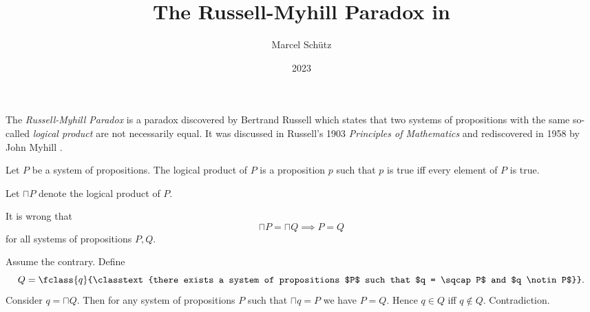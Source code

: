 \documentclass{stex}
\title{The Russell-Myhill Paradox in \Naproche}
\author{Marcel Schütz}
\date{2023}
\begin{document}
\maketitle


\noindent The \emph{Russell-Myhill Paradox} is a paradox discovered by Bertrand Russell which states that two systems of propositions with the same so-called \emph{logical product} are not necessarily equal.
It was discussed in Russell's 1903 \emph{Principles of Mathematics} \cite[Appendix B]{Russell1903} and rediscovered in 1958 by John Myhill \cite{Myhill1958}.

\begin{fsignature*}
  Let $P$ be a system of propositions.
  The logical product of $P$ is a proposition $p$ such that $p$ is true iff every element of $P$ is true.
\end{fsignature*}

Let $\sqcap P$ denote the logical product of $P$.

\begin{ftheorem*}[label=russell_myhill_paradox,title=Russell-Myhill Paradox]
  It is wrong that
  \[ \sqcap P = \sqcap Q \implies P = Q \]
  for all systems of propositions $P, Q$.
\end{ftheorem*}
\begin{fproof}
  Assume the contrary.
  Define \[Q = \fclass{q}{\classtext{there exists a system of propositions $P$ such that $q = \sqcap P$ and $q \notin P$}}.\]
  Consider $q = \sqcap Q$.
  Then for any system of propositions $P$ such that $\sqcap q = P$ we have $P = Q$.
  Hence $q \in Q$ iff $q \notin Q$.
  Contradiction.
\end{fproof}

\printbibliography
\end{document}
